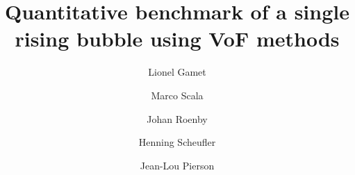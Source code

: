 \documentclass[review]{elsarticle}
\begin{document}
\begin{frontmatter}

\title{Quantitative benchmark of a single rising bubble using VoF methods}

\author[ifpenaddress]{Lionel Gamet}

\author[ifpenaddress]{Marco Scala}

\author[stromningaddress]{Johan Roenby}

\author[dlraddress]{Henning Scheufler}

\author[ifpenaddress]{Jean-Lou Pierson}

\address[ifpenaddress]{IFPEN Lyon, Process Experimentation Division, 69360 Solaize, France}
\address[stromningaddress]{STROMNING, Luftmarinegade 62, 1432 K{\o}benhavn K, Denmark}
\address[dlraddress]{DLR German Aerospace Center, Institute of Space Systems, 28359 Bremen, Germany}


\end{frontmatter}
\end{document}
